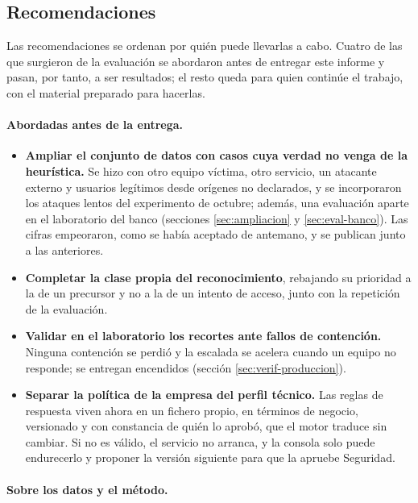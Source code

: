 \subsection*{Recomendaciones}

Las recomendaciones se ordenan por quién puede llevarlas a cabo. Cuatro de las que surgieron de la
evaluación se abordaron antes de entregar este informe y pasan, por tanto, a ser resultados; el
resto queda para quien continúe el trabajo, con el material preparado para hacerlas.

\paragraph{Abordadas antes de la entrega.}

\begin{itemize}
  \item \textbf{Ampliar el conjunto de datos con casos cuya verdad no venga de la heurística.} Se
        hizo con otro equipo víctima, otro servicio, un atacante externo y usuarios legítimos desde
        orígenes no declarados, y se incorporaron los ataques lentos del experimento de octubre;
        además, una evaluación aparte en el laboratorio del banco (secciones \ref{sec:ampliacion} y
        \ref{sec:eval-banco}). Las cifras empeoraron, como se había aceptado de antemano, y se
        publican junto a las anteriores.
  \item \textbf{Completar la clase propia del reconocimiento}, rebajando su prioridad a la de un
        precursor y no a la de un intento de acceso, junto con la repetición de la evaluación.
  \item \textbf{Validar en el laboratorio los recortes ante fallos de contención.} Ninguna contención
        se perdió y la escalada se acelera cuando un equipo no responde; se entregan encendidos
        (sección \ref{sec:verif-produccion}).
  \item \textbf{Separar la política de la empresa del perfil técnico.} Las reglas de respuesta viven
        ahora en un fichero propio, en términos de negocio, versionado y con constancia de quién lo
        aprobó, que el motor traduce sin cambiar. Si no es válido, el servicio no arranca, y la consola
        solo puede endurecerlo y proponer la versión siguiente para que la apruebe Seguridad.
\end{itemize}

\paragraph{Sobre los datos y el método.}

